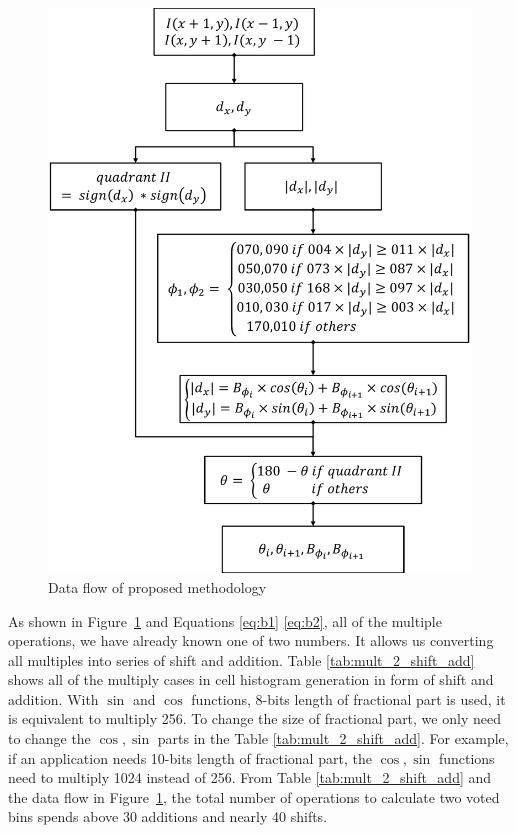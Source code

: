\begin{figure}[t]
	\def\sscale{1.0\linewidth}
	\includegraphics[width=\sscale]{"imgs/dataflow"}
	\caption{Data flow of proposed methodology}
	\label{fig:dataflow}
\end{figure}

As shown in Figure~\ref{fig:dataflow} and Equations \ref{eq:b1} \ref{eq:b2}, all
of the multiple operations, we have already known one of two numbers.
It allows us converting all multiples into series of shift and addition.
Table \ref{tab:mult_2_shift_add} shows all of the multiply cases in cell histogram
generation in form of shift and addition.
With $\sin$ and $\cos$ functions, 8-bits length of fractional part is used, it
is equivalent to multiply 256.
To change the size of fractional part, we only need to change the $\cos, \sin$
parts in the Table \ref{tab:mult_2_shift_add}.
For example, if  an application needs 10-bits length of fractional part, the $\cos, \sin$
functions need to multiply 1024 instead of 256.
From Table \ref{tab:mult_2_shift_add} and the data flow in
Figure~\ref{fig:dataflow}, the total number of operations to calculate two voted
bins spends above 30 additions and nearly 40  shifts.

